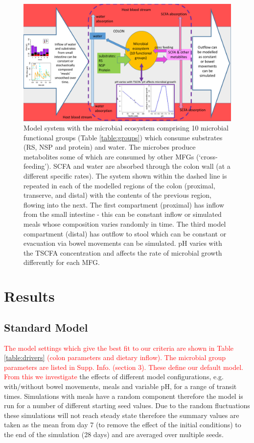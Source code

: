 \documentclass[a4paper]{article}
\begin{document}
\begin{figure}
    \centering
   \includegraphics[scale=0.3]{images/microbeEco4.pdf}
   \caption{Model system with the microbial ecosystem comprising 10 microbial functional groups (Table \ref{table:groups}) which consume substrates (RS, NSP and protein) and water. The microbes produce metabolites some of which are consumed by other MFGs (`cross-feeding'). SCFA and water are absorbed through the colon wall (at a different specific rates). The system shown within the dashed line is repeated in each of the modelled regions of the colon (proximal, transerve, and distal) with the contents of the previous region, flowing into the next. The first compartment (proximal) has inflow from the small intestine - this can be constant inflow or simulated meals whose composition varies randomly in time. The third model compartment (distal) has outflow to stool which can be constant or evacuation via bowel movements can be simulated. pH varies with the TSCFA concentration and affects the rate of microbial growth differently for each MFG.
    }
    \label{fig:schematic}
\end{figure}



\section*{Results} %


\subsection*{Standard Model}
\textcolor{red}{The model settings which give the best fit to our criteria are shown in Table \ref{table:drivers} (colon parameters and dietary inflow). The microbial group parameters are listed in Supp. Info. (section 3). These define our default model. From this we investigate} the effects of different model configurations, e.g. with/without bowel movements, meals and variable pH, for a range of transit times.
Simulations with meals have a random component therefore the model is run for a number of different starting seed values.
Due to the random fluctuations these simulations will not reach steady state therefore the summary values are taken as the mean from day 7 (to remove the effect of the initial conditions) to the end of the simulation (28 days) and are averaged over multiple seeds.
\end{document}
